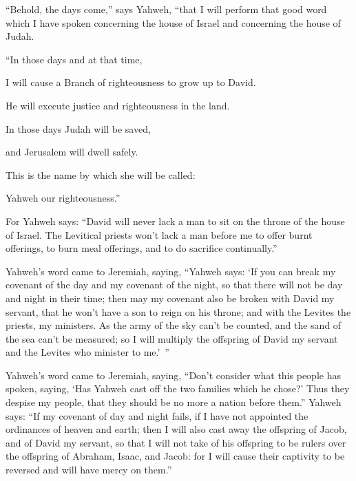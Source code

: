 {\par }{\PP {}“Behold, the days come,” says Yahweh, “that I will perform that good word which I have spoken concerning the house of Israel and concerning the house of Judah.
\par }{\Q {}“In those days and at that time,
\par }{\QB I will cause a Branch of righteousness to grow up to David.
\par }{\QB He will execute justice and righteousness in the land.
\par }{\Q {}In those days Judah will be saved,
\par }{\QB and Jerusalem will dwell safely.
\par }{\Q This is the name by which she will be called:
\par }{\QB Yahweh our righteousness.”
\par }{\PP {}For Yahweh says: “David will never lack a man to sit on the throne of the house of Israel.
The Levitical priests won’t lack a man before me to offer burnt offerings, to burn meal offerings, and to do sacrifice continually.”
\par }{\PP {}Yahweh’s word came to Jeremiah, saying,
“Yahweh says: ‘If you can break my covenant of the day and my covenant of the night, so that there will not be day and night in their time;
then may my covenant also be broken with David my servant, that he won’t have a son to reign on his throne; and with the Levites the priests, my ministers.
As the army of the sky can’t be counted, and the sand of the sea can’t be measured; so I will multiply the offspring of David my servant and the Levites who minister to me.’ ”
\par }{\PP {}Yahweh’s word came to Jeremiah, saying,
“Don’t consider what this people has spoken, saying, ‘Has Yahweh cast off the two families which he chose?’ Thus they despise my people, that they should be no more a nation before them.”
Yahweh says: “If my covenant of day and night fails, if I have not appointed the ordinances of heaven and earth;
then I will also cast away the offspring of Jacob, and of David my servant, so that I will not take of his offspring to be rulers over the offspring of Abraham, Isaac, and Jacob: for I will cause their captivity to be reversed and will have mercy on them.”

}
